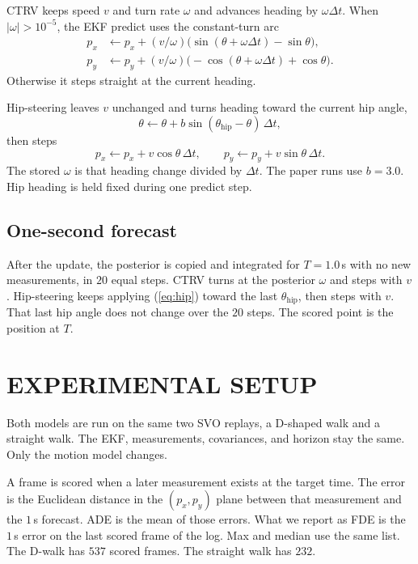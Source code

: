 \documentclass[letterpaper, 10pt, conference]{IEEEtran}
\begin{document}
CTRV keeps speed $v$ and turn rate $\omega$ and advances heading by
$\omega\Delta t$. When $|\omega|>10^{-5}$, the EKF predict uses the
constant-turn arc
\begin{equation}
\begin{aligned}
p_x &\leftarrow p_x+(v/\omega)\bigl(\sin(\theta+\omega\Delta t)-\sin\theta\bigr),\\
p_y &\leftarrow p_y+(v/\omega)\bigl(-\cos(\theta+\omega\Delta t)+\cos\theta\bigr).
\end{aligned}
\end{equation}
Otherwise it steps straight at the current heading.

Hip-steering leaves $v$ unchanged and turns heading toward the current hip
angle,
\begin{equation}
\label{eq:hip}
\theta \leftarrow \theta + b\sin(\theta_{\mathrm{hip}}-\theta)\,\Delta t,
\end{equation}
then steps
\begin{equation}
p_x \leftarrow p_x+v\cos\theta\,\Delta t,\qquad
p_y \leftarrow p_y+v\sin\theta\,\Delta t.
\end{equation}
The stored $\omega$ is that heading change divided by $\Delta t$. The paper
runs use $b=3.0$. Hip heading is held fixed during one predict step.

\subsection{One-second forecast}

After the update, the posterior is copied and integrated for $T=1.0$\,s
with no new measurements, in $20$ equal steps. CTRV turns at the posterior
$\omega$ and steps with $v$. Hip-steering keeps applying
(\ref{eq:hip}) toward the last $\theta_{\mathrm{hip}}$, then steps with $v$. That last hip angle does not
change over the $20$ steps. The scored point is the position at $T$.

\section{EXPERIMENTAL SETUP}

Both models are run on the same two SVO replays, a D-shaped walk and a
straight walk. The EKF, measurements, covariances, and horizon stay the
same. Only the motion model changes.

A frame is scored when a later measurement exists at the target time. The
error is the Euclidean distance in the $(p_x,p_y)$ plane between that
measurement and the $1$\,s forecast. ADE is the mean of those errors. What
we report as FDE is the $1$\,s error on the last scored frame of the log.
Max and median use the same list. The D-walk has $537$ scored frames. The
straight walk has $232$.
\end{document}
